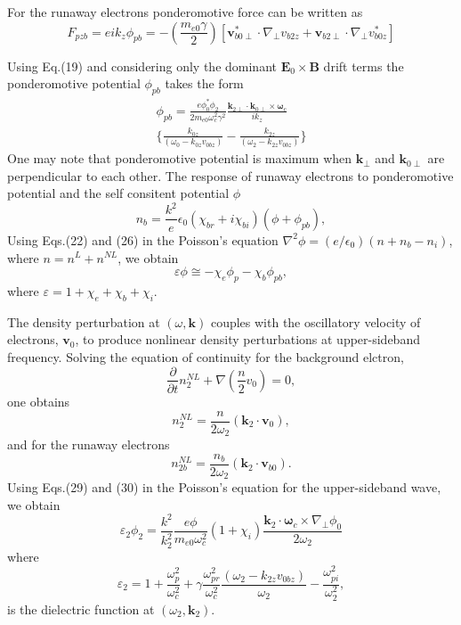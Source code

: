 \documentclass[aip,pop,amsmath,amssymb,showpacs,reprint,floatfix,lengthcheck]{revtex4-1}
\begin{document}
For the runaway electrons ponderomotive force   can be written as
\begin{equation}
 F_{pzb}=ei k_{z}\phi _{pb}=-(\frac{m_{e0}\gamma}{2})[\textbf{v}_{b0\perp}^{*}\cdot\nabla_{\perp}v_{b2z}+\textbf{v}_{b2\perp}\cdot\nabla_{\perp}v_{b0z}^{*}]
\end{equation}

Using Eq.(19) and considering only the dominant $\textbf{E}_{0}\times\textbf{B}$ drift terms the ponderomotive potential $\phi_{pb}$ takes the form
\begin{eqnarray}
 \phi_{pb}=\frac{e\phi_{0}^*\phi_{2}}{2m_{e0}\omega_{c}^2{\gamma}^2} \frac{\textbf{k}_{2\perp}\cdot \textbf{k}_{0\perp}\times \boldsymbol{\omega}_{c}}{ik_{z}}\nonumber\\
\biggl\{\frac{k_{0z}}{(\omega_{0}-k_{0z}v_{0bz})}-\frac{k_{2z}}{(\omega_{2}-k_{2z}v_{0bz})}\biggr\}
\end{eqnarray}
One may note that ponderomotive potential is maximum when $\textbf{k}_{\perp}$ and $\textbf{k}_{0\perp}$ are perpendicular to each other. The response of runaway electrons to ponderomotive potential and the self consitent potential $\phi$
\begin{equation}
 n_{b}=\frac{k^2}{e}\epsilon_{0}(\chi_{br}+i\chi_{bi})(\phi+\phi_{pb}), 
\end{equation}
Using Eqs.(22) and (26) in the Poisson's equation $\nabla ^2 \phi = (e/\epsilon_{0}) (n+n_{b}-n_{i})$, where $n=n^{L}+n^{NL}$, we obtain
\begin{equation}
 \varepsilon \phi \cong-\chi_{e}\phi_{p}-\chi_{b}\phi_{pb},
\end{equation}
where $\varepsilon=1+\chi_{e}+\chi_{b}+\chi_{i}$.

The density perturbation at $(\omega, \textbf{k})$ couples with the oscillatory velocity of electrons, $\textbf{v}_{0}$, to produce nonlinear density perturbations at upper-sideband frequency. Solving the equation of continuity for the background elctron, 
\begin{equation}
 \frac{\partial}{\partial t}n_{2}^{NL}+\nabla(\frac{n}{2}v_{0})=0,
\end{equation}
one obtains 
\begin{equation}
 n_{2}^{NL}=\frac{n}{2\omega_{2}}(\textbf{k}_{2}\cdot\textbf{v}_{0}),
\end{equation}
and for the runaway electrons 
\begin{equation}
 n_{2b}^{NL}=\frac{n_{b}}{2\omega_{2}}(\textbf{k}_{2}\cdot\textbf{v}_{b0}).
\end{equation}
Using Eqs.(29) and (30) in the Poisson's equation for the upper-sideband wave, we obtain
\begin{equation}
\varepsilon_{2}\phi_{2}=\frac{k^2}{k_{2}^2}\frac{e\phi}{m_{e0}{\omega_{c}^2}}(1+\chi_{i})\frac{\textbf{k}_{2}\cdot{\boldsymbol{\omega}}_{c}\times \nabla_{\perp}\phi_{0}}{2\omega_{2}}
\end{equation}
where
\begin{equation}
\varepsilon_{2}=1+\frac{\omega_{p}^2}{\omega_{c}^2}+\gamma\frac{\omega_{pr}^2}{\omega_{c}^2}\frac{(\omega_{2}-k_{2z}v_{0bz})}{\omega_{2}}-\frac{\omega_{pi}^2}{\omega_{2}^2},
\end{equation}
is the dielectric function at $(\omega_{2},\textbf{k}_{2})$.
\end{document}
